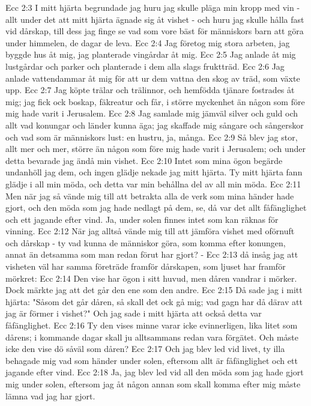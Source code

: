 Ecc 2:3  I mitt hjärta begrundade jag huru jag skulle pläga min kropp med vin - allt under det att mitt hjärta ägnade sig åt vishet - och huru jag skulle hålla fast vid dårskap, till dess jag finge se vad som vore bäst för människors barn att göra under himmelen, de dagar de leva.
Ecc 2:4  Jag företog mig stora arbeten, jag byggde hus åt mig, jag planterade vingårdar åt mig.
Ecc 2:5  Jag anlade åt mig lustgårdar och parker och planterade i dem alla slags fruktträd.
Ecc 2:6  Jag anlade vattendammar åt mig för att ur dem vattna den skog av träd, som växte upp.
Ecc 2:7  Jag köpte trälar och trälinnor, och hemfödda tjänare fostrades åt mig; jag fick ock boskap, fäkreatur och får, i större myckenhet än någon som före mig hade varit i Jerusalem.
Ecc 2:8  Jag samlade mig jämväl silver och guld och allt vad konungar och länder kunna äga; jag skaffade mig sångare och sångerskor och vad som är människors lust: en hustru, ja, många.
Ecc 2:9  Så blev jag stor, allt mer och mer, större än någon som före mig hade varit i Jerusalem; och under detta bevarade jag ändå min vishet.
Ecc 2:10  Intet som mina ögon begärde undanhöll jag dem, och ingen glädje nekade jag mitt hjärta. Ty mitt hjärta fann glädje i all min möda, och detta var min behållna del av all min möda.
Ecc 2:11  Men när jag så vände mig till att betrakta alla de verk som mina händer hade gjort, och den möda som jag hade nedlagt på dem, se, då var det allt fåfänglighet och ett jagande efter vind. Ja, under solen finnes intet som kan räknas för vinning.
Ecc 2:12  När jag alltså vände mig till att jämföra vishet med oförnuft och dårskap - ty vad kunna de människor göra, som komma efter konungen, annat än detsamma som man redan förut har gjort? -
Ecc 2:13  då insåg jag att visheten väl har samma företräde framför dårskapen, som ljuset har framför mörkret:
Ecc 2:14  Den vise har ögon i sitt huvud, men dåren vandrar i mörker. Dock märkte jag att det går den ene som den andre.
Ecc 2:15  Då sade jag i mitt hjärta: "Såsom det går dåren, så skall det ock gå mig; vad gagn har då därav att jag är förmer i vishet?" Och jag sade i mitt hjärta att också detta var fåfänglighet.
Ecc 2:16  Ty den vises minne varar icke evinnerligen, lika litet som dårens; i kommande dagar skall ju alltsammans redan vara förgätet. Och måste icke den vise dö såväl som dåren?
Ecc 2:17  Och jag blev led vid livet, ty illa behagade mig vad som händer under solen, eftersom allt är fåfänglighet och ett jagande efter vind.
Ecc 2:18  Ja, jag blev led vid all den möda som jag hade gjort mig under solen, eftersom jag åt någon annan som skall komma efter mig måste lämna vad jag har gjort.
